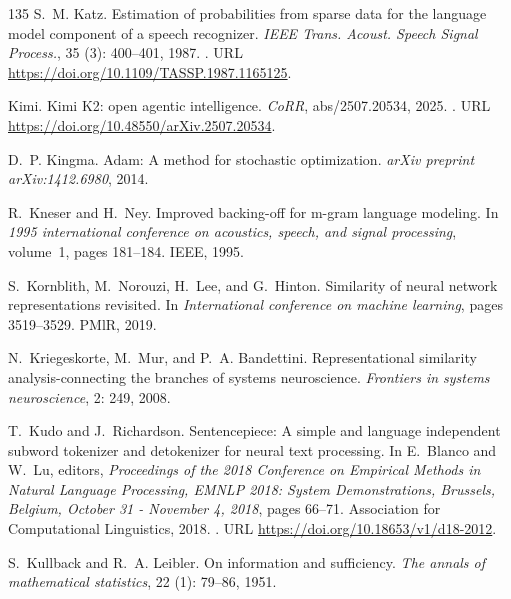 \begin{thebibliography}{135}
S.~M. Katz.
\newblock Estimation of probabilities from sparse data for the language model
  component of a speech recognizer.
\newblock \emph{{IEEE} Trans. Acoust. Speech Signal Process.}, 35
  (3): 400--401, 1987.
\newblock {}.
\newblock URL \url{https://doi.org/10.1109/TASSP.1987.1165125}.

Kimi.
\newblock Kimi {K2:} open agentic intelligence.
\newblock \emph{CoRR}, abs/2507.20534, 2025.
\newblock {}.
\newblock URL \url{https://doi.org/10.48550/arXiv.2507.20534}.

D.~P. Kingma.
\newblock Adam: A method for stochastic optimization.
\newblock \emph{arXiv preprint arXiv:1412.6980}, 2014.

R.~Kneser and H.~Ney.
\newblock Improved backing-off for m-gram language modeling.
\newblock In \emph{1995 international conference on acoustics, speech, and
  signal processing}, volume~1, pages 181--184. IEEE, 1995.

S.~Kornblith, M.~Norouzi, H.~Lee, and G.~Hinton.
\newblock Similarity of neural network representations revisited.
\newblock In \emph{International conference on machine learning}, pages
  3519--3529. PMlR, 2019.

N.~Kriegeskorte, M.~Mur, and P.~A. Bandettini.
\newblock Representational similarity analysis-connecting the branches of
  systems neuroscience.
\newblock \emph{Frontiers in systems neuroscience}, 2: 249, 2008.

T.~Kudo and J.~Richardson.
\newblock Sentencepiece: {A} simple and language independent subword tokenizer
  and detokenizer for neural text processing.
\newblock In E.~Blanco and W.~Lu, editors, \emph{Proceedings of the 2018
  Conference on Empirical Methods in Natural Language Processing, {EMNLP} 2018:
  System Demonstrations, Brussels, Belgium, October 31 - November 4, 2018},
  pages 66--71. Association for Computational Linguistics, 2018.
\newblock {}.
\newblock URL \url{https://doi.org/10.18653/v1/d18-2012}.

S.~Kullback and R.~A. Leibler.
\newblock On information and sufficiency.
\newblock \emph{The annals of mathematical statistics}, 22
  (1): 79--86, 1951.


\end{thebibliography}
